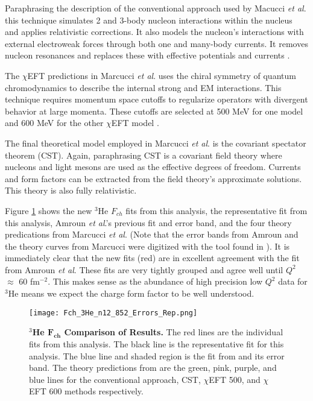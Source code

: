 Paraphrasing the description of the conventional approach used by Macucci \textit{et al}. this technique simulates 2 and 3-body nucleon interactions within the nucleus and applies relativistic corrections. It also models the nucleon's interactions with external electroweak forces through both one and many-body currents. It removes nucleon resonances and replaces these with effective potentials and currents \cite{Article:Marcucci}.

The $\chi$EFT predictions in Marcucci \textit{et al}. uses the chiral symmetry of quantum chromodynamics to describe the internal strong and EM interactions. This technique requires momentum space cutoffs to regularize operators with divergent behavior at large momenta. These cutoffs are selected at 500 MeV for one model and 600 MeV for the other $\chi$EFT model \cite{Article:Marcucci}.

The final theoretical model employed in Marcucci \textit{et al}. is the covariant spectator theorem (CST). Again, paraphrasing \cite{Article:Marcucci} CST is a covariant field theory where nucleons and light mesons are used as the effective degrees of freedom. Currents and form factors can be extracted from the field theory's approximate solutions. This theory is also fully relativistic.

Figure \ref{fig:3he_fch_theory} shows the new $^3$He $F_{ch}$ fits from this analysis, the representative fit from this analysis, Amroun \textit{et al}.'s previous fit and error band, and the four theory predications from Marcucci \textit{et al}. (Note that the error bands from Amroun and the theory curves from Marcucci were digitized with the tool found in \cite{web_plot_digitizer}). It is immediately clear that the new fits (red) are in excellent agreement with the fit from Amroun \textit{et al}. These fits are very tightly grouped and agree well until $Q^2$ $\approx$ 60 fm$^{-2}$. This makes sense as the abundance of high precision low $Q^2$ data for $^3$He means we expect the charge form factor to be well understood. 


\begin{figure}[!ht]
	\begin{center}
	\texttt{[image: Fch\_3He\_n12\_852\_Errors\_Rep.png]}
	\end{center}
	\caption[$^3$He $F_{ch}$ Comparison of Results]{
	{\bf{$^3$He $\boldsymbol{F_{ch}}$ Comparison of Results.}} The red lines are the individual fits from this analysis. The black line is the representative fit for this analysis. The blue line and shaded region is the fit from \cite{Article:Amroun} and its error band. The theory predictions from \cite{Article:Marcucci} are the green, pink, purple, and blue lines for the conventional approach, CST, $\chi$EFT 500, and $\chi$EFT 600 methods respectively.}
	\label{fig:3he_fch_theory}
\end{figure}
	
